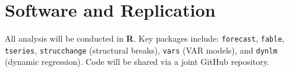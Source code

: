 \section{Software and Replication}

All analysis will be conducted in \textbf{R}. Key packages include:
\texttt{forecast}, \texttt{fable}, \texttt{tseries}, \texttt{strucchange}
(structural breaks), \texttt{vars} (VAR models), and \texttt{dynlm} (dynamic
regression). Code will be shared via a joint GitHub repository.

